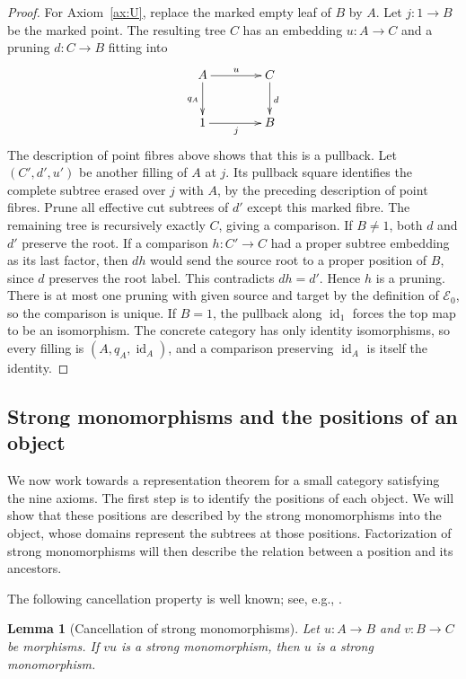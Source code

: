 \documentclass[11pt,a4paper]{article}
\theoremstyle{plain}
\newtheorem{lemma}[theorem]{Lemma}
\theoremstyle{definition}
\theoremstyle{remark}
\newcommand{\Dcat}{\mathcal E}
\newcommand{\one}{1}
\newcommand{\id}{\operatorname{id}}
\begin{document}
\begin{proof}
For Axiom~\ref{ax:U}, replace the marked empty leaf of $B$ by $A$.
Let $j:\one\to B$ be the marked point. The resulting tree $C$
has an embedding $u:A\to C$ and a pruning $d:C\to B$ fitting into
\[
 \xymatrix@C=4em@R=2.5em{
A\ar[r]^u\ar[d]_{q_A}&C\ar[d]^d\\
 \one\ar[r]_j&B
 }
\]
The description of point fibres above shows that this is a pullback.
Let $(C',d',u')$ be another filling of $A$ at $j$. Its
pullback square identifies the complete subtree erased over $j$
with $A$, by the preceding description of point fibres. Prune all
effective cut subtrees of $d'$ except this marked fibre. The remaining tree is recursively
exactly $C$, giving a comparison. If $B\ne\one$, both $d$ and $d'$ preserve the root. If a comparison
$h:C'\to C$ had a proper subtree embedding as its last factor, then
$dh$ would send the source root to a proper position of $B$, since
$d$ preserves the root label. This contradicts $dh=d'$. Hence $h$ is a pruning. There is at most one pruning with given
source and target by the definition of $\Dcat_0$, so the comparison
is unique.
If $B=\one$, the pullback along $\id_\one$ forces the top map
to be an isomorphism. The concrete category has only identity
isomorphisms, so every filling is $(A,q_A,\id_A)$, and a
comparison preserving $\id_A$ is itself the identity.
\end{proof}

\subsection{Strong monomorphisms and the positions of an object}\label{sec:strong-positions}

We now work towards a representation theorem for a small category
satisfying the nine axioms. The first step is to identify the
positions of each object. We will show that these positions are
described by the strong monomorphisms into the object, whose domains
represent the subtrees at those positions. Factorization of strong
monomorphisms will then describe the relation between a position
and its ancestors.

The following cancellation property is well known; see, e.g.,
\cite[p.~292]{CassidyHebertKelly}.

\begin{lemma}[Cancellation of strong monomorphisms]\label{lem:strong-cancel}
Let $u:A\to B$ and $v:B\to C$ be morphisms. If $vu$ is a
strong monomorphism, then $u$ is a strong monomorphism.
\end{lemma}
\end{document}
